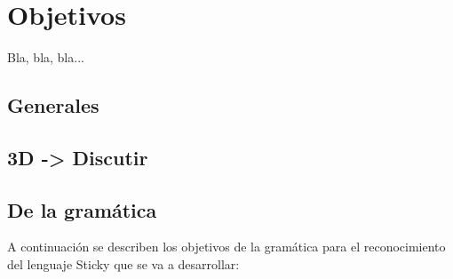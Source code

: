 \chapter{Objetivos}
Bla, bla, bla...


   \section{Generales}

   \section{3D -> Discutir} %

   \section{De la gramática}
   A continuación se describen los objetivos de la gramática para el reconocimiento del lenguaje Sticky que se va a desarrollar: 
